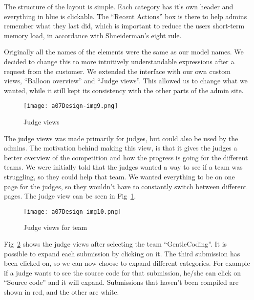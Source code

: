 The structure of the layout is simple. Each category has
it's own header and everything in blue is clickable.
The ``Recent Actions'' box is there
to help admins remember what they last did, which is important to
reduce the users short-term memory load, in accordance with
Shneiderman's eight rule.

Originally all the names of the elements were the same as our model
names. We decided to change this to more intuitively understandable
expressions after a request from the customer.
We extended the interface with our own custom views, ``Balloon overview'' and ``Judge views''. 
This allowed us to change 
what we wanted, while it still kept its consistency with the other parts 
of the admin site.



 \begin{figure}[h!]
	\texttt{[image: a07Design-img9.png]} 
	\caption{Judge views}
	\label{fig:judge}
\end{figure}

The judge views was made primarily for judges, but could also be used
by the admins. The motivation behind making this view, is that it gives
the judges a better overview of the competition and how the progress
is going for the different teams. We were initially told that the
judges wanted a way to see if a team was struggling, so they could help
that team. We wanted everything to be on one page for the judges, so they
wouldn't have to constantly switch between different pages. The judge view can be seen in Fig~\ref{fig:judge}.

 \begin{figure}[h!]
	\texttt{[image: a07Design-img10.png]} 
	\caption{Judge views for team}
	\label{fig:judgeTeam}
\end{figure}


Fig~\ref{fig:judgeTeam} shows the judge views after selecting the team
``GentleCoding''.
It is possible to expand each submission by clicking on it. The third
submission has been clicked on, so we can now choose to expand
different categories. For example if a judge wants to see the source
code for that submission, he/she can click on ``Source code'' and it will
expand. Submissions that
haven't been compiled are shown in red, and the other are white.
